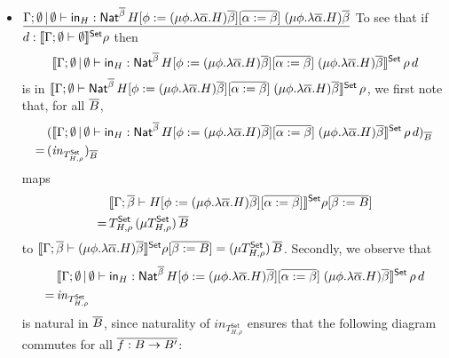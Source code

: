 \documentclass{lmcs}
\theoremstyle{plain}\newtheorem{satz}[thm]{Satz}
\newcommand{\set}{\mathsf{Set}}
\begin{document}
{\begin{itemize}
\item
$\underline{\Gamma;\emptyset \,|\, \emptyset \vdash \mathsf{in}_H :
  \mathsf{Nat}^{\overline{\beta}} \, H[\phi := (\mu \phi.\lambda
    {\overline \alpha}.H){\overline \beta}][\overline{\alpha := \beta}]
  \;(\mu \phi.\lambda {\overline \alpha}.H){\overline \beta}}$\; To
  see that if $d : \setsem{\Gamma;\emptyset \vdash \emptyset} \rho$
  then $$\setsem{\Gamma;\emptyset \,|\, \emptyset \vdash \tin_H :
    \Nat^{\ol{\beta}} \, H[\phi := (\mu \phi.\lambda
      {\overline \alpha}.H){\overline \beta}][\ol{\alpha := \beta}]
    \;(\mu \phi.\lambda {\overline \alpha}.H){\overline \beta}}\,
  \rho\,d$$ 
  is in $\setsem{\Gamma;\emptyset \vdash
    \Nat^{\ol{\beta}} \, H[\phi := (\mu \phi.\lambda
      {\overline \alpha}.H){\overline \beta}][\ol{\alpha := \beta}]
    \;(\mu \phi.\lambda {\overline \alpha}.H){\overline \beta}}\,
  \rho$, we first note that, for all $\overline{B}$,
  \begin{align*}
    &(\setsem{\Gamma;\emptyset \,|\, \emptyset \vdash \tin_H :
    \Nat^{\ol{\beta}} \, H[\phi := (\mu \phi.\lambda
      {\overline \alpha}.H){\overline \beta}][\ol{\alpha := \beta}]
    \;(\mu \phi.\lambda {\overline \alpha}.H){\overline \beta}}\,
  \rho\,d)_{\ol{B}}\, \\
    =\,
    &(\mathit{in}_{T^\set_{H,\rho}})_{\ol{B}}
  \end{align*}
  maps
  \begin{align*}
    &\setsem{\Gamma;\ol{\beta} \vdash H[\phi := (\mu
      \phi.\lambda {\overline \alpha}.H){\overline \beta}][\ol{\alpha
        := \beta}]}\rho[\ol{\beta := B}]  \\ = \,
    &T^\set_{H,\rho}\, (\mu T^\set_{H,\rho}) \, \ol{B}
  \end{align*}
        to $\setsem{\Gamma;\ol{\beta}
    \vdash (\mu \phi.\lambda {\overline \alpha}.H){\overline \beta}}
  \rho[\ol{\beta := B}] = (\mu
  T^\set_{H,\rho}) \, \ol{B}$. 
  Secondly, we observe
  that
  \begin{align*}
    &\setsem{\Gamma;\emptyset \,|\, \emptyset \vdash \tin_H :
    \Nat^{\ol{\beta}} \, H[\phi := (\mu \phi.\lambda
      {\overline \alpha}.H){\overline \beta}][\ol{\alpha := \beta}]
    \;(\mu \phi.\lambda {\overline \alpha}.H){\overline
      \beta}}\,\rho\,d \\ 
      = \, &\mathit{in}_{T^\set_{H,\rho}}
  \end{align*}
  is natural in $\overline{B}$, since naturality of
  $\mathit{in}_{T^\set_{H,\rho}}$
  ensures that the following diagram commutes for all $\overline{f : B \to
    B'}$:


\end{itemize}}
\end{document}
